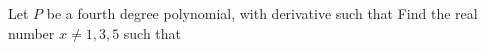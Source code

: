 Let $P$ be a fourth degree polynomial, with derivative  such that   Find the real number $x\neq 1,3,5$ such that 